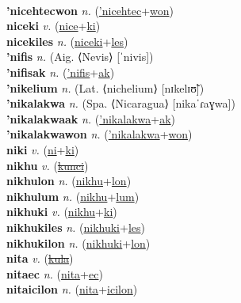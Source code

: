  \label{'nicehtec} \\
\textbf{'nicehtecwon} \textit{n.} (\hyperref['nicehtec]{'nicehtec}+\hyperref[won]{won})
 \label{'nicehtecwon} \\
\textbf{niceki} \textit{v.} (\hyperref[nice]{nice}+\hyperref[ki]{ki})
 \label{niceki} \\
\textbf{nicekiles} \textit{n.} (\hyperref[niceki]{niceki}+\hyperref[les]{les})
 \label{nicekiles} \\
\textbf{'nifis} \textit{n.} (Aig. ⟨Nevis⟩ [ˈnivis])
 \label{'nifis} \\
\textbf{'nifisak} \textit{n.} (\hyperref['nifis]{'nifis}+\hyperref[ak]{ak})
 \label{'nifisak} \\
\textbf{'nikelium} \textit{n.} (Lat. ⟨nichelium⟩ [nɪkelɪʊ̃])
 \label{'nikelium} \\
\textbf{'nikalakwa} \textit{n.} (Spa. ⟨Nicaragua⟩ [nikaˈɾaɣwa])
 \label{'nikalakwa} \\
\textbf{'nikalakwaak} \textit{n.} (\hyperref['nikalakwa]{'nikalakwa}+\hyperref[ak]{ak})
 \label{'nikalakwaak} \\
\textbf{'nikalakwawon} \textit{n.} (\hyperref['nikalakwa]{'nikalakwa}+\hyperref[won]{won})
 \label{'nikalakwawon} \\
\textbf{niki} \textit{v.} (\hyperref[ni]{ni}+\hyperref[ki]{ki})
 \label{niki} \\
\textbf{nikhu} \textit{v.} (\hyperref[kunci]{\sout{kunci}})
 \label{nikhu} \\
\textbf{nikhulon} \textit{n.} (\hyperref[nikhu]{nikhu}+\hyperref[lon]{lon})
 \label{nikhulon} \\
\textbf{nikhulum} \textit{n.} (\hyperref[nikhu]{nikhu}+\hyperref[lum]{lum})
 \label{nikhulum} \\
\textbf{nikhuki} \textit{v.} (\hyperref[nikhu]{nikhu}+\hyperref[ki]{ki})
 \label{nikhuki} \\
\textbf{nikhukiles} \textit{n.} (\hyperref[nikhuki]{nikhuki}+\hyperref[les]{les})
 \label{nikhukiles} \\
\textbf{nikhukilon} \textit{n.} (\hyperref[nikhuki]{nikhuki}+\hyperref[lon]{lon})
 \label{nikhukilon} \\
\textbf{nita} \textit{v.} (\hyperref[kula]{\sout{kula}})
 \label{nita} \\
\textbf{nitaec} \textit{n.} (\hyperref[nita]{nita}+\hyperref[ec]{ec})
 \label{nitaec} \\
\textbf{nitaicilon} \textit{n.} (\hyperref[nita]{nita}+\hyperref[icilon]{icilon})
 \label{nitaicilon} \\
